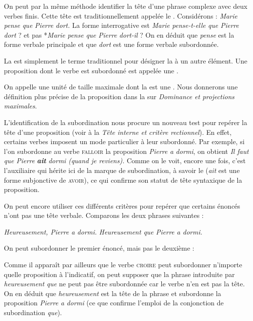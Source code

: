 On peut par la même méthode identifier la tête d’une phrase complexe avec deux verbes finis. Cette tête est traditionnellement appelée le . Considérons :
\ea
\textit{{Marie pense que Pierre dort}.}
\z
La forme interrogative est \textit{Marie pense-t-elle que Pierre dort} ? et pas *\textit{Marie pense que Pierre dort-il} ? On en déduit que \textit{pense} est la forme verbale principale et que \textit{dort} est une forme verbale subordonnée.

{La  est simplement le terme traditionnel pour désigner la  à un autre élément.  Une proposition dont le verbe est subordonné est appelée une .}

On appelle  une unité de taille maximale dont la  est une . Nous donnerons une définition plus précise de la proposition dans la  sur \textit{Dominance et projections maximales}.

L’identification de la subordination nous procure un nouveau test pour repérer la tête d’une proposition (voir  à la  \textit{Tête interne et critère rectionnel}). En effet, certains verbes imposent un mode particulier à leur subordonné. Par exemple, si l’on subordonne au verbe \textsc{falloir} la proposition \textit{Pierre a dormi}, on obtient \textit{Il faut que Pierre} \textbf{\textit{ait}} \textit{dormi (quand je reviens).} Comme on le voit, encore une fois, c’est l’auxiliaire qui hérite ici de la marque de subordination, à savoir le  (\textit{ait} est une forme subjonctive de \textsc{avoir}), ce qui confirme son statut de tête syntaxique de la proposition.

On peut encore utiliser ces différents critères pour repérer que certains énoncés n’ont pas une tête verbale. Comparons les deux phrases suivantes :

\ea 
  \ea \textit{Heureusement, Pierre a dormi.}
  \ex \textit{Heureusement que Pierre a dormi.}
  \z
\z

On peut subordonner le premier énoncé, mais pas le deuxième :

\ea
  \z
\z

Comme il apparaît par ailleurs que le verbe \textsc{croire} peut subordonner n’importe quelle proposition à l’indicatif, on peut supposer que la phrase introduite par \textit{heureusement que} ne peut pas être subordonnée car le verbe n’en est pas la tête. On en déduit que \textit{heureusement} est la tête de la phrase et subordonne la proposition \textit{Pierre a dormi} (ce que confirme l’emploi de la conjonction de subordination \textit{que}).

